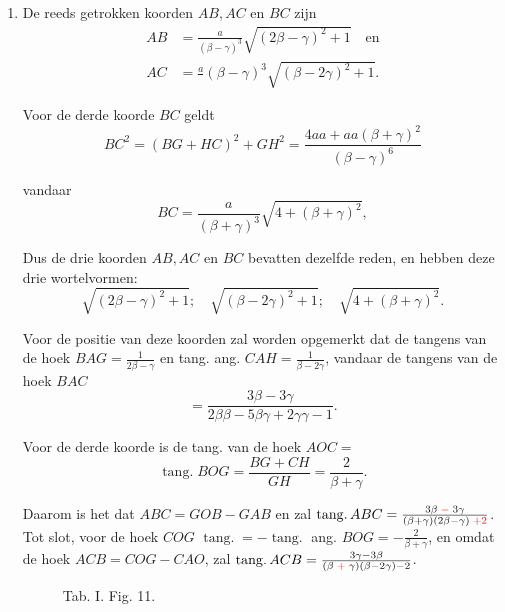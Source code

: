 \documentclass[10pt,a4paper]{article}
\newcommand{\switchenum}{\setcounter{enumi}{\arabic{enumi}-1}\switchcolumn}
\DeclareMathOperator{\tang}{tang.}
\begin{document}
\begin{paracol}{2}
\begin{enumerate}[topsep=1px]
		\switchenum
		\item De reeds getrokken koorden $AB, AC$ en $BC$ zijn
		\begin{align*}
			AB &= \frac{a}{(\beta-\gamma)^3}\sqrt{(2\beta-\gamma)^2 +1} \quad \text{en}\\
			AC & = \frac{a}{}(\beta-\gamma)^3\sqrt{(\beta - 2\gamma)^2+1}.
		\end{align*}
		\par Voor de derde koorde $BC$ geldt
		\[
			BC^2 = (BG + HC)^2 + GH^2 = \frac{4aa+aa(\beta+ \gamma)^2}{(\beta - \gamma )^6}
		\]
		\par vandaar
		\[
			BC = \frac{a}{(\beta+\gamma)^3} \sqrt{4+(\beta+\gamma)^2},
		\]
		\par Dus de drie koorden $AB, AC$ en $BC$ bevatten dezelfde reden, en hebben deze drie wortelvormen:
		\[
			\sqrt{(2\beta-\gamma)^2+1}; \quad \sqrt{(\beta-2\gamma)^2+1}; \quad \sqrt{4+(\beta+\gamma)^2}.
		\]
		\par Voor de positie van deze koorden zal worden opgemerkt dat de tangens van de hoek $BAG = \frac{1}{2\beta- \gamma}$ en tang. ang. $CAH = \frac{1}{\beta - 2\gamma}$, vandaar de tangens van de hoek $BAC$
		\[
			= \frac{3\beta - 3\gamma}{2\beta \beta - 5\beta \gamma + 2\gamma \gamma -1}.
		\]
		\par Voor de derde koorde is de tang. van de hoek $AOC=$
		\[
			\tang BOG = \frac{BG + CH}{GH} = \frac{2}{\beta + \gamma}.
		\]
		\par Daarom is het dat $ABC = GOB - GAB$ en zal $\tang ABC = \frac{3\beta \;{\color{red}-}\; 3\gamma}{(\beta+\gamma)(2\beta - \gamma)\;{\color{red}+2}}$. Tot slot, voor de hoek $COG$ $\tang = -\tang$ ang. $BOG = -\frac{2}{\beta+\gamma}$, en omdat de hoek  $ACB = COG-CAO$, zal $\tang ACB = \frac{3\gamma-3\beta}{(\beta \;{\color{red}+}\; \gamma)(\beta - 2\gamma)-2}$.
		
		\switchcolumn*
		
		\begin{figure}[h]
			\centering
			\par {
				\selectfont
				\begin{tikzpicture}[rotate=180, scale=1]
				
				\end{tikzpicture}}
			\selectfont
			\caption{Tab. I. Fig. 11.}
		\end{figure}
		\switchcolumn
		\begin{figure}[h]
			\centering
			\par {
				\selectfont
				\begin{tikzpicture}[rotate=180, scale=1]
				

\end{tikzpicture}}
\end{figure}
\end{enumerate}
\end{paracol}
\end{document}
